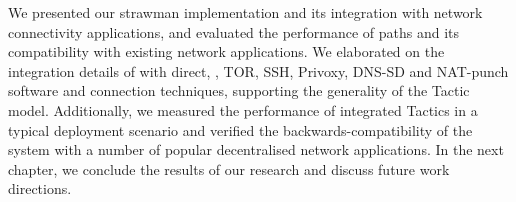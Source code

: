 We presented our strawman \signpost implementation and its  integration with
network connectivity applications, and evaluated the performance of \signpost
paths and its compatibility with existing network applications. We elaborated on
the integration details of \signpost  with direct, \openvpn, TOR, SSH, Privoxy,
DNS-SD and NAT-punch software and connection techniques, supporting  the
generality of the \signpost Tactic model. Additionally, we measured the
performance of integrated Tactics in a typical deployment scenario and verified
the backwards-compatibility of the system with a number of popular decentralised
network applications. In the next chapter, we conclude the results of our research and
discuss future work directions.
